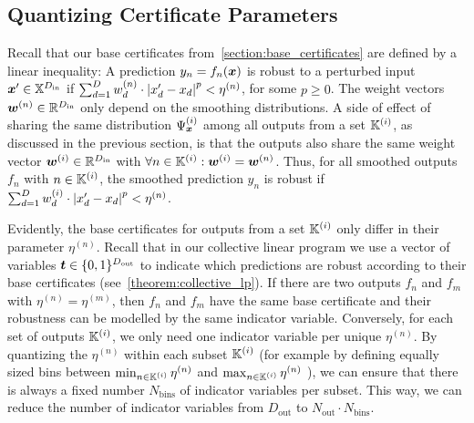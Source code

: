 \subsection{Quantizing Certificate Parameters}\label{section:quantizing_base_certs}
Recall that our base certificates from~\autoref{section:base_certificates} are defined by a linear inequality: 
A prediction $y_n = f_n({\bm{x}})$ is robust to a perturbed input ${\bm{x}}' \in {\mathbb{X}}^{D_\mathrm{in}}$ if
$\sum_{d=1}^{D} {w}_d^{(n)} \cdot \left| {x}'_d - {x}_d \right|^p < \eta^{(n)}$, for some $p \geq 0$.
The weight vectors ${\bm{w}}^{(n)} \in {\mathbb{R}}^{D_\mathrm{in}}$ only depend on the smoothing distributions.
A side of effect of sharing the same distribution $\Psi_{\bm{x}}^{(i)}$ among all outputs from a set ${\mathbb{K}}^{(i)}$, as discussed in the previous section, is that the outputs also share the same weight vector
${\bm{w}}^{(i)} \in {\mathbb{R}}^{D_\mathrm{in}}$
with $\forall n \in {\mathbb{K}}^{(i)}: {\bm{w}}^{(i)} = {\bm{w}}^{(n)}$.
Thus, for all smoothed outputs $f_n$ with $n \in {\mathbb{K}}^{(i)}$, the smoothed prediction $y_n$ is robust if
$\sum_{d=1}^{D} {w}_d^{(i)} \cdot \left| {x}'_d - {x}_d \right|^p < \eta^{(n)}$.

Evidently, the base certificates for outputs from a set ${\mathbb{K}}^{(i)}$ only differ in their parameter  $\eta^{(n)}$.
Recall that in our collective linear program we use a vector of variables ${\bm{t}} \in \{0,1\}^{D_\mathrm{out}}$ to indicate which predictions are robust according to their base certificates (see~\autoref{theorem:collective_lp}).
If there are two outputs $f_n$ and $f_m$ with $\eta^{(n)} = \eta^{(m)}$, then $f_n$ and $f_m$ have the same base certificate and their robustness can be modelled by the same indicator variable.
Conversely, for each set of outputs ${\mathbb{K}}^{(i)}$, we only need one indicator variable per unique $\eta^{(n)}$.
By quantizing the $\eta^{(n)}$ within each subset ${\mathbb{K}}^{(i)}$ (for example by defining equally sized bins between
$\min_{n \in {\mathbb{K}}^{(i)}} \eta^{(n)}$ and $\max_{n \in {\mathbb{K}}^{(i)}} \eta^{(n)}$
), we can ensure that there is always a fixed number $N_\mathrm{bins}$ of indicator variables per subset.
This way, we can reduce the number of indicator variables from $D_\mathrm{out}$ to $N_\mathrm{out} \cdot N_\mathrm{bins}$.

